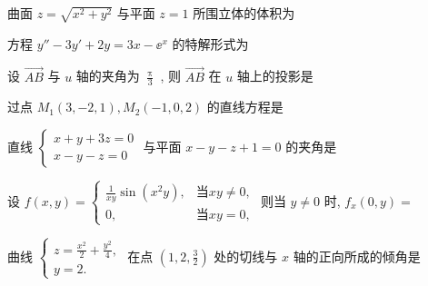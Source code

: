\begin{ti}
	曲面 $z=\sqrt{x^{2}+y^{2}}$ 与平面 $z=1$ 所围立体的体积为 \kuo
\end{ti}

\begin{ti}
	方程 $y''-3 y'+2 y=3 x-\ee^{x}$ 的特解形式为 \kuo
\end{ti}

\begin{ti}
	设 $\overrightarrow{AB}$ 与 $u$ 轴的夹角为 $\frac{\uppi}{3}$ , 则 $\overrightarrow{AB}$ 在 $u$ 轴上的投影是 \kuo
\end{ti}

\begin{ti}
	过点 $M_{1}(3,-2,1), M_{2}(-1,0,2)$ 的直线方程是 \kuo
\end{ti}

\begin{ti}
	直线 $\begin{cases}
		x+y+3 z=0\\
		x-y-z=0
	\end{cases}$ 与平面 $x-y-z+1=0$ 的夹角是 \kuo
\end{ti}

\begin{ti}
	设 $f(x,y)=\begin{cases}
		\frac{1}{xy}\sin\left(x^2y\right), & \text{当}xy\ne0,\\
		0, & \text{当}xy=0,
	\end{cases}$ 则当 $y\ne0$ 时, $f_{x}(0,y)=$ \kuo
\end{ti}

\begin{ti}
	曲线 $\begin{cases}
		z=\frac{x^2}{2}+\frac{y^2}{4},\\
		y=2.
	\end{cases}$ 在点 $\left( 1,2,\frac{3}{2} \right)$ 处的切线与 $x$ 轴的正向所成的倾角是 \kuo
\end{ti}

